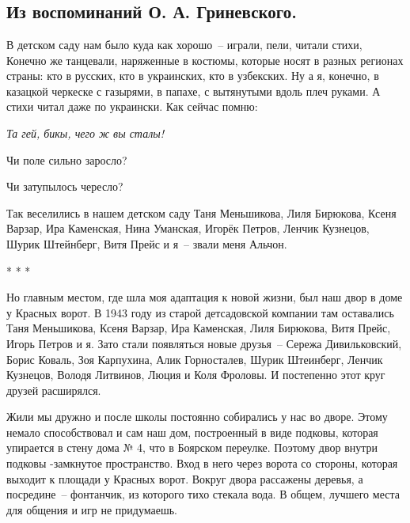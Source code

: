 \chapter{}

\section*{Из воспоминаний О. А. Гриневского.}

﻿В детском саду нам было куда как хорошо~-- играли, пели, читали стихи, Конечно же танцевали, наряженные в костюмы, которые носят в разных регионах страны: кто в русских, кто в украинских, кто в узбекских. Ну а я, конечно, в казацкой черкеске с газырями, в папахе, с вытянутыми вдоль плеч руками. А стихи читал даже по украински. Как сейчас помню: 

\indent

{\itshape
Та гей, бикы, чего ж вы сталы! 

Чи поле сильно заросло? 

Чи затупылось чересло?
}

\indent

Так  веселились  в  нашем  детском   саду  Таня  Меньшикова,   Лиля Бирюкова, Ксеня Варзар, Ира Каменская, Нина Уманская, Игорёк Петров, Ленчик Кузнецов, Шурик Штейнберг, Витя Прейс и я~-- звали меня Альчон. 

\indent

\begin{center} 
    * * *
\end{center}

\indent

Но главным местом, где шла моя адаптация к новой жизни, был наш двор в доме у Красных ворот. В 1943 году из старой детсадовской компании там оставались Таня Меньшикова, Ксеня Варзар, Ира Каменская, Лиля Бирюкова, Витя Прейс, Игорь Петров и я. Зато стали появляться новые друзья~-- Сережа Дивильковский, Борис Коваль, Зоя Карпухина, Алик Горносталев, Шурик Штеинберг, Ленчик Кузнецов, Володя Литвинов, Люция и Коля Фроловы. И постепенно этот круг друзей расширялся.

Жили мы дружно и после школы постоянно собирались у нас во дворе. Этому немало способствовал и сам наш дом, построенный в виде подковы, которая упирается в стену дома № 4, что в Боярском переулке. Поэтому двор внутри подковы -замкнутое пространство. Вход в него через ворота со стороны, которая выходит к площади у Красных ворот. Вокруг двора рассажены деревья, а посредине~-- фонтанчик, из которого тихо стекала вода. В общем, лучшего места для общения и игр не придумаешь.

